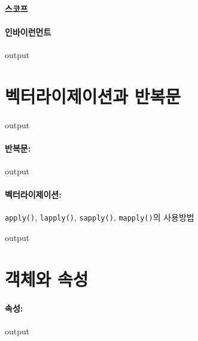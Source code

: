 \documentclass{report}
\begin{document}
\paragraph{스코프}

\paragraph{인바이런먼트}
\begin{Schunk}
\begin{Soutput}
output
\end{Soutput}
\end{Schunk}

\section{벡터라이제이션과 반복문} 
\begin{Schunk}
\begin{Soutput}
output
\end{Soutput}
\end{Schunk}

\paragraph{반복문:}
\begin{Schunk}
\begin{Soutput}
output
\end{Soutput}
\end{Schunk}

\paragraph{벡터라이제이션:} \texttt{apply()}, \texttt{lapply()}, \texttt{sapply()}, \texttt{mapply()}의 사용방법
\begin{Schunk}
\begin{Soutput}
output
\end{Soutput}
\end{Schunk}


\section{객체와 속성}
\paragraph{속성:}

\begin{Schunk}
\begin{Soutput}
output
\end{Soutput}
\end{Schunk}
\end{document}
